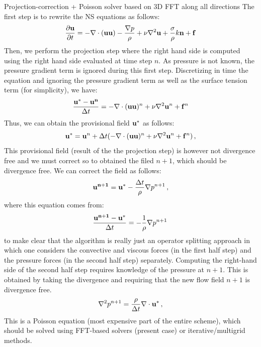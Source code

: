 \documentclass[11pt]{article}
\begin{document}
Projection-correction + Poisson solver based on 3D FFT along all directions
The first step is to rewrite the NS equations as follows:
\begin{equation}
\frac{\partial {\bf u}}{\partial t} = - \nabla \cdot ({\bf u}{\bf u}) - \frac{ \nabla p}{\rho}  +  \nu \nabla^2 {\bf u}  + \frac{ \sigma}{\rho} k {\bf n} + {\bf f}
\end{equation}
Then, we perform the projection step where the right hand side is computed using the right hand side evaluated at time step $n$.
As pressure is not known, the pressure gradient term is ignored during this first step.
Discretizing in time the equation and ignoring the pressure gradient term as well as the surface tension term (for simplicity), we have:
\begin{equation}
\frac{ {\bf u^* - u^n}}{\Delta t} = - \nabla \cdot ({\bf u}{\bf u})^n +  \nu \nabla^2 {\bf u}^n  + {\bf f}^n
\end{equation}
Thus, we can obtain the provisional field $\bf u^*$ as follows:
\begin{equation}
{\bf u^*} = {\bf u}^n + \Delta t (  - \nabla \cdot (  {\bf u}{\bf u})^n +  \nu \nabla^2 {\bf u}^n  + {\bf f}^n)\, ,
\end{equation}
This provisional field (result of the the projection step) is however not divergence free and we must correct so to obtained the filed $n+1$, which should be divergence free.
We can correct the field as follows:
\begin{equation}
{\bf u^{n+1}} = {\bf u}^* - \frac{\Delta t}{\rho} \nabla p^{n+1}\, ,
\end{equation}
where this equation comes from:
\begin{equation}
\frac{ {\bf u^{n+1} - u^*}}{\Delta t} = - \frac{1}{\rho} \nabla p^{n+1}\, 
\end{equation}
to make clear that the algorithm is really just an operator splitting approach in which one considers the convective and viscous forces (in the first half step) and the pressure forces (in the second half step) separately.
Computing the right-hand side of the second half step requires knowledge of the pressure at $n+1$.
This is obtained by taking the divergence and requiring that the new flow field $n+1$ is divergence free.
\begin{equation}
\nabla^2 p^{n+1} = \frac{\rho}{\Delta t} \nabla \cdot {\bf u^*}\, ,
\end{equation}
This is a Poisson equation (most expensive part of the entire scheme), which should be solved using FFT-based solvers (present case) or iterative/multigrid methods. 
\end{document}
